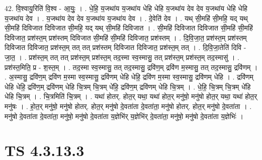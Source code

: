 \documentclass[17pt]{extarticle}
\begin{document}
42. वि॒श्वायु॒रिति॑ वि॒श्व - आ॒युः॒ । . धे॒हि॒ य॒जथा॑य य॒जथा॑य धेहि धेहि य॒जथा॑य देव देव य॒जथा॑य धेहि धेहि य॒जथा॑य देव । . य॒जथा॑य देव देव य॒जथा॑य य॒जथा॑य देव । . दे॒वेति॑ देव । . यथ् सी॒महि॑ सी॒महि॒ यद् यथ् सी॒महि॑ दिविजात दिविजात सी॒महि॒ यद् यथ् सी॒महि॑ दिविजात । . सी॒महि॑ दिविजात दिविजात सी॒महि॑ सी॒महि॑ दिविजात॒ प्रश॑स्त॒म् प्रश॑स्तम् दिविजात सी॒महि॑ सी॒महि॑ दिविजात॒ प्रश॑स्तम् । . दि॒वि॒जा॒त॒ प्रश॑स्त॒म् प्रश॑स्तम् दिविजात दिविजात॒ प्रश॑स्त॒म् तत् तत् प्रश॑स्तम् दिविजात दिविजात॒ प्रश॑स्त॒म् तत् । . दि॒वि॒जा॒तेति॑ दिवि - जा॒त॒ । . प्रश॑स्त॒म् तत् तत् प्रश॑स्त॒म् प्रश॑स्त॒म् तद॒स्मा स्व॒स्मासु॒ तत् प्रश॑स्त॒म् प्रश॑स्त॒म् तद॒स्मासु॑ । . प्रश॑स्त॒मिति॒ प्र - श॒स्त॒म् । . तद॒स्मा स्व॒स्मासु॒ तत् तद॒स्मासु॒ द्रवि॑ण॒म् द्रवि॑ण म॒स्मासु॒ तत् तद॒स्मासु॒ द्रवि॑णम् । . अ॒स्मासु॒ द्रवि॑ण॒म् द्रवि॑ण म॒स्मा स्व॒स्मासु॒ द्रवि॑णम् धेहि धेहि॒ द्रवि॑ण म॒स्मा स्व॒स्मासु॒ द्रवि॑णम् धेहि । . द्रवि॑णम् धेहि धेहि॒ द्रवि॑ण॒म् द्रवि॑णम् धेहि चि॒त्रम् चि॒त्रम् धे॑हि॒ द्रवि॑ण॒म् द्रवि॑णम् धेहि चि॒त्रम् । . धे॒हि॒ चि॒त्रम् चि॒त्रम् धे॑हि धेहि चि॒त्रम् । . चि॒त्रमिति॑ चि॒त्रम् । . यथा॑ होतर्. होत॒र् यथा॒ यथा॑ होत॒र् मनु॑षो॒ मनु॑षो होत॒र् यथा॒ यथा॑ होत॒र् मनु॑षः । . हो॒त॒र् मनु॑षो॒ मनु॑षो होतर्. होत॒र् मनु॑षो दे॒वता॑ता दे॒वता॑ता॒ मनु॑षो होतर्. होत॒र् मनु॑षो दे॒वता॑ता । . मनु॑षो दे॒वता॑ता दे॒वता॑ता॒ मनु॑षो॒ मनु॑षो दे॒वता॑ता य॒ज्ञेभि॑र् य॒ज्ञेभि॑र् दे॒वता॑ता॒ मनु॑षो॒ मनु॑षो दे॒वता॑ता य॒ज्ञेभिः॑ । \newline
\pagebreak
{}

\section{ TS 4.3.13.3 }
\end{document}
